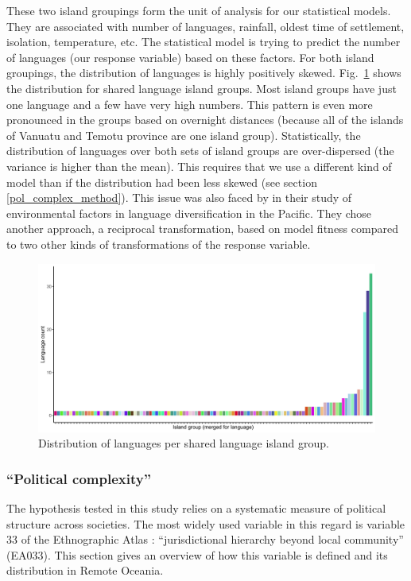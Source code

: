 \documentclass[a4paper,10pt]{article} %
\begin{document}
These two island groupings form the unit of analysis for our statistical models. They are associated with number of languages, rainfall, oldest time of settlement, isolation, temperature, etc. The statistical model is trying to predict the number of languages (our response variable) based on these factors. For both island groupings, the distribution of languages is highly positively skewed. Fig.~\ref{dist_lg_medium} shows the distribution for shared language island groups. Most island groups have just one language and a few have very high numbers. This pattern is even more pronounced in the groups based on overnight distances (because all of the islands of Vanuatu and Temotu province are one island group). Statistically, the distribution of languages over both sets of island groups are over-dispersed (the variance is higher than the mean).
This requires that we use a different kind of model than if the distribution had been less skewed (see section \ref{pol_complex_method}). This issue was also faced by \citet{gavin2012island} in their study of environmental factors in language diversification in the Pacific. They chose another approach, a reciprocal transformation, based on model fitness compared to two other kinds of transformations of the response variable.

\begin{figure}[ht]
\centering
\includegraphics[width=13cm]{illustrations/plots_from_R/Lg_distrubition_medium_island_group_lg_merged.png}
\caption{{Distribution of languages per shared language island group.}}
\label{dist_lg_medium}
\end{figure}

\subsubsection{``Political complexity''}
\label{prediting:sec:pol:complex}
The hypothesis tested in this study relies on a systematic measure of political structure across societies. The most widely used variable in this regard is variable 33 of the Ethnographic Atlas \citep{EA_1971}: ``jurisdictional hierarchy beyond local community'' (EA033). This section gives an overview of how this variable is defined and its distribution in Remote Oceania. 
\end{document}
